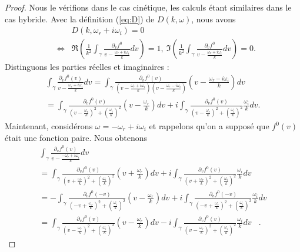 \begin{proof}
Nous le vérifions dans le cas cinétique, les calculs étant similaires dans le cas hybride. Avec la définition (\ref{eq:D}) de $D(k,\omega)$, nous avons 
\begin{eqnarray*}
&&D(k,\omega_r+i\omega_i)=0\\
&\Leftrightarrow&
\Re\left(\frac{1}{k^2}\int_\gamma\frac{\partial_vf^0}{v-\frac{\omega_r+i\omega_i}{k}}dv\right)=1,~\Im\left(\frac{1}{k^2}\int_\gamma\frac{\partial_vf^0}{v-\frac{\omega_r+i\omega_i}{k}}dv\right)=0. 
\end{eqnarray*}
Distinguons les parties réelles et imaginaires :
\begin{eqnarray*}
\int_\gamma\frac{\partial_vf^0(v)}{v-\frac{\omega_r+i\omega_i}{k}}dv=\int_\gamma\frac{\partial_vf^0(v)}{\left(v-\frac{\omega_r+i\omega_i}{k}\right)\left(v-\frac{\omega_r-i\omega_i}{k}\right)}\left(v-\frac{\omega_r-i\omega_i}{k}\right)dv\\
=\int_\gamma\frac{\partial_vf^0(v)}{\left(v-\frac{\omega_r}{k}\right)^2+\left(\frac{\omega_i}{k}\right)^2}\left(v-\frac{\omega_r}{k}\right)dv+i\int_\gamma\frac{\partial_vf^0(v)}{\left(v-\frac{\omega_r}{k}\right)^2+\left(\frac{\omega_i}{k}\right)^2}\frac{\omega_i}{k}dv.
\end{eqnarray*}
Maintenant, considérons $\omega=-\omega_r+i\omega_i$ et rappelons qu'on a supposé que $f^0(v)$ était une fonction paire. Nous obtenons
\begin{eqnarray*}
\int_\gamma\frac{\partial_vf^0(v)}{v-\frac{-\omega_r+i\omega_i}{k}}dv~~~~~~~~~~~~~~~~~~~~~~~~~~~~~~~~~~~~~~~~~~~~~~~~~~~~~~~~~~~~~~~~~~~~~~~~~~~~~~~~\\
=\int_\gamma\frac{\partial_vf^0(v)}{\left(v+\frac{\omega_r}{k}\right)^2+\left(\frac{\omega_i}{k}\right)^2}\left(v+\frac{\omega_r}{k}\right)dv+i\int_\gamma\frac{\partial_vf^0(v)}{\left(v+\frac{\omega_r}{k}\right)^2+\left(\frac{\omega_i}{k}\right)^2}\frac{\omega_i}{k}dv~~~~\\
=-\int_\gamma\frac{\partial_{v}f^0(-v)}{\left(-v+\frac{\omega_r}{k}\right)^2+\left(\frac{\omega_i}{k}\right)^2}\left(v-\frac{\omega_r}{k}\right)dv+i\int_\gamma\frac{\partial_vf^0(-v)}{\left(-v+\frac{\omega_r}{k}\right)^2+\left(\frac{\omega_i}{k}\right)^2}\frac{\omega_i}{k}dv\\
=\int_\gamma\frac{\partial_vf^0(v)}{\left(v-\frac{\omega_r}{k}\right)^2+\left(\frac{\omega_i}{k}\right)^2}\left(v-\frac{\omega_r}{k}\right)dv-i\int_\gamma\frac{\partial_vf^0(v)}{\left(v-\frac{\omega_r}{k}\right)^2+\left(\frac{\omega_i}{k}\right)^2}\frac{\omega_i}{k}dv~~~~.

\end{eqnarray*}
\end{proof}
